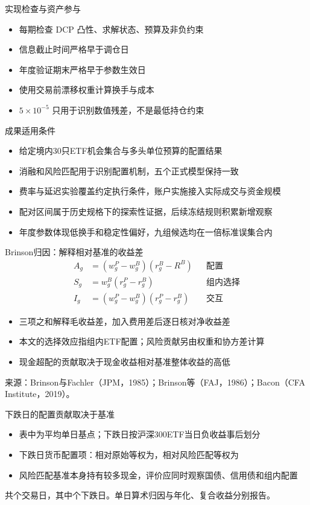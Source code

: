 \documentclass[aspectratio=169,11pt]{beamer}
\begin{document}
\begin{frame}{实现检查与资产参与}
\begin{itemize}
\item 每期检查 DCP 凸性、求解状态、预算及非负约束
\item 信息截止时间严格早于调仓日
\item 年度验证期末严格早于参数生效日
\item 使用交易前漂移权重计算换手与成本
\item $5\times10^{-5}$ 只用于识别数值残差，不是最低持仓约束
\end{itemize}
\end{frame}
\begin{frame}{成果适用条件}
\begin{itemize}
\item 给定境内30只ETF机会集合与多头单位预算的配置结果
\item 消融和风险匹配用于识别配置机制，五个正式模型保持一致
\item 费率与延迟实验覆盖约定执行条件，账户实施接入实际成交与资金规模
\item 配对区间属于历史规格下的探索性证据，后续冻结规则积累新增观察
\item 年度参数体现低换手和稳定性偏好，九组候选均在一倍标准误集合内
\end{itemize}
\end{frame}
\begin{frame}{Brinson归因：解释相对基准的收益差}
\small
\begin{align*}
A_g&=(w^P_g-w^B_g)(r^B_g-R^B) &&\text{配置}\\
S_g&=w^B_g(r^P_g-r^B_g) &&\text{组内选择}\\
I_g&=(w^P_g-w^B_g)(r^P_g-r^B_g) &&\text{交互}
\end{align*}
\begin{itemize}
\item 三项之和解释毛收益差，加入费用差后逐日核对净收益差
\item 本文的选择效应指组内ETF配置；风险贡献另由权重和协方差计算
\item 现金超配的贡献取决于现金收益相对基准整体收益的高低
\end{itemize}
\scriptsize 来源：Brinson与Fachler（JPM，1985）；Brinson等（FAJ，1986）；Bacon（CFA Institute，2019）。
\end{frame}
\begin{frame}{下跌日的配置贡献取决于基准}
\resizebox{\textwidth}{!}{}
\par\medskip
\begin{itemize}
\item 表中为平均单日基点；下跌日按沪深300ETF当日负收益事后划分
\item 下跌日货币配置项：相对原始等权为\attrEqualCashDown{}，相对风险匹配等权为\attrMatchedCashDown{}
\item 风险匹配基准本身持有较多现金，评价应同时观察国债、信用债和组内配置
\end{itemize}
\medskip\scriptsize
共\attrDays{}个交易日，其中\attrDownDays{}个下跌日。单日算术归因与年化、复合收益分别报告。
\end{frame}
\end{document}
